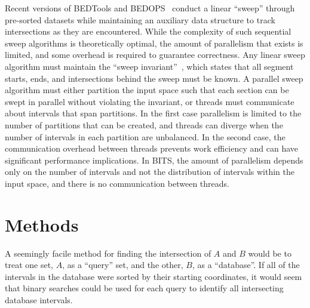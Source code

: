 \documentclass{bioinfo}
\begin{document}

Recent versions of BEDTools and BEDOPS~\citep{neph2012} conduct a
linear ``sweep'' through pre-sorted datasets while maintaining an auxiliary
data structure to track intersections as they are encountered. While the
complexity of such sequential sweep algorithms is theoretically optimal, the 
amount of parallelism that exists is limited, and some overhead is required to
guarantee correctness.  Any linear sweep algorithm must maintain the ``sweep
invariant''~\citep{mckenney2009}, which states that all segment starts, ends, 
and intersections behind the sweep must be known.  A parallel sweep algorithm
must either partition the input space such that each section can be swept in
parallel without violating the invariant, or threads must communicate 
about intervals that span partitions.  In the first case parallelism is limited
to the number of partitions that can be created, and threads can diverge when 
the number of intervals in each partition are unbalanced.  In the second case,
the communication overhead between threads prevents work efficiency and can 
have significant performance implications.  In BITS, the amount of parallelism
depends only on the number of intervals and not the distribution of intervals
within the input space, and there is no communication between threads.



\section{Methods}


A seemingly facile method for finding the intersection of $A$ and $B$ would be
to treat one set, $A$, as a ``query'' set, and the other, $B$, as a
``database''.  If all of the intervals in the database were sorted by their
starting coordinates, it would seem that binary searches could be used for each
query to identify all intersecting database intervals. 
\end{document}
